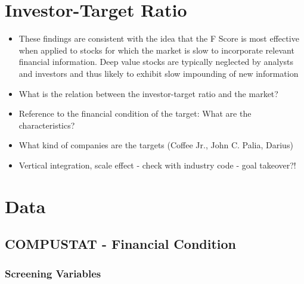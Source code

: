\documentclass[12pt]{article}
\begin{document}
\section{Investor-Target Ratio} 

    \begin{itemize}

        \item These findings are consistent with the idea that the F Score is most effective when applied to stocks for which the market is slow to incorporate relevant financial information. Deep value stocks are typically neglected by analysts and investors and thus likely to exhibit slow impounding of new information \citep{Hyde2014}
        
        \item What is the relation between the investor-target ratio and the market?
        
        \item Reference to the financial condition of the target: What are the characteristics?
        
        \item What kind of companies are the targets (Coffee Jr., John C. Palia, Darius)

        \item Vertical integration, scale effect - check with industry code - goal takeover?! 
        



    \end{itemize}

\section{Data}

    \subsection{COMPUSTAT - Financial Condition}
    
     \subsubsection{Screening Variables}
\end{document}
